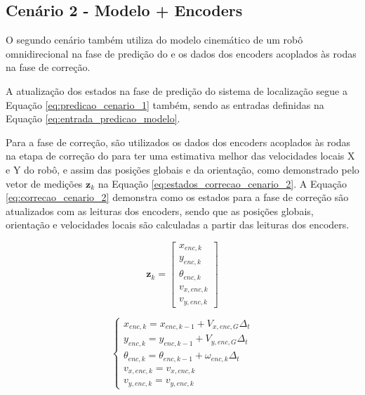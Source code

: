 \documentclass[acronym, symbols, table]{fei}
\begin{document}
		\subsection{Cenário 2 - Modelo + Encoders} \label{sec:implementacao_cenario_2}
		
			O segundo cenário também utiliza do modelo cinemático de um robô omnidirecional na fase de predição do  e os dados dos encoders acoplados às rodas na fase de correção.
			
			A atualização dos estados na fase de predição do sistema de localização segue a Equação \ref{eq:predicao_cenario_1} também, sendo as entradas definidas na Equação \ref{eq:entrada_predicao_modelo}.
			
			Para a fase de correção, são utilizados os dados dos encoders acoplados às rodas na etapa de correção do  para ter uma estimativa melhor das velocidades locais X e Y do robô, e assim das posições globais e da orientação, como demonstrado pelo vetor de medições $\textbf{z}_k$ na Equação \ref{eq:estados_correcao_cenario_2}. A Equação \ref{eq:correcao_cenario_2} demonstra como os estados para a fase de correção são atualizados com as leituras dos encoders, sendo que as posições globais, orientação e velocidades locais são calculadas a partir das leituras dos encoders. 
			
	 		\begin{equation}\label{eq:estados_correcao_cenario_2}
				\textbf{z}_k  = 
				\begin{bmatrix}
					x_{enc,k} \\
					y_{enc,k} \\
					\theta_{enc,k} \\
					v_{x,enc,k} \\
					v_{y,enc,k}
				\end{bmatrix}
			\end{equation}
			
			\begin{equation}\label{eq:correcao_cenario_2}
				\begin{cases}
					x_{enc,k} = x_{enc,k-1} + V_{x,enc,G} \Delta_t \\
					y_{enc,k} = y_{enc,k-1} + V_{y,enc,G} \Delta_t  \\
					\theta_{enc,k} = \theta_{enc,k-1} + \omega_{enc,k} \Delta_t \\
					v_{x,enc,k} = v_{x,enc,k}\\
					v_{y,enc,k} = v_{y,enc,k}
				\end{cases}
			\end{equation}
			
\end{document}
